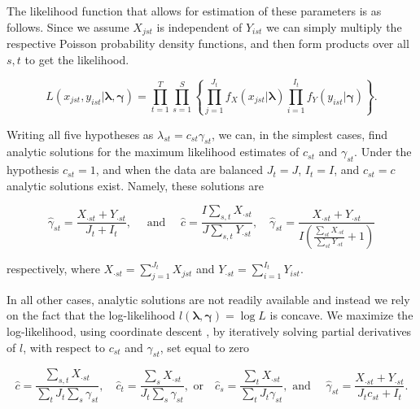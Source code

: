 The likelihood function that allows for estimation of these parameters is as follows.  Since we assume $X_{jst}$ is independent of $Y_{ist}$ we can simply multiply the respective Poisson probability density functions, and then form products over all $s,t$ to get the likelihood.  

\begin{equation}
  \label{eq:likelihood}
  L(x_{jst}, y_{ist} |\boldsymbol{\lambda}, \boldsymbol{\gamma}) = \prod_{t = 1}^{T} \prod_{s=1}^S \left\{ \prod_{j=1}^{J_t} f_X(x_{jst}|\boldsymbol{\lambda}) \prod_{i=1}^{I_t} f_Y(y_{ist} | \boldsymbol{\gamma}) \right\}.
\end{equation}

\noindent Writing all five hypotheses as $\lambda_{st} = c_{st}\gamma_{st}$, we can, in the simplest cases, find analytic solutions for the maximum likelihood estimates of $c_{st}$ and $\gamma_{st}$.  Under the hypothesis $c_{st} = 1$, and when the data are balanced $J_t = J$, $I_t = I$, and $c_{st} = c$ analytic solutions exist.  Namely, these solutions are

\begin{equation*}
  \hat{\gamma}_{st} = \frac{X_{\cdot st} + Y_{\cdot st}}{J_t + I_t}, \quad \text{ and } \quad \hat{c} = \frac{I \sum_{s,t} X_{\cdot st}}{J \sum_{s,t} Y_{\cdot st}}, \quad \hat{\gamma}_{st} = \frac{X_{\cdot st} + Y_{\cdot st}}{I \left( \frac{\sum_{st} X_{\cdot st}}{\sum_{st} Y_{\cdot st}} + 1 \right)}
\end{equation*}

\noindent respectively, where $X_{\cdot st} = \sum_{j=1}^{J_t}X_{jst}$ and $Y_{\cdot st} = \sum_{i=1}^{I_t} Y_{ist}$.

In all other cases, analytic solutions are not readily available and instead we rely on the fact that the log-likelihood $l(\boldsymbol{\lambda}, \boldsymbol{\gamma}) = \log{L}$ is concave.  We maximize the log-likelihood, using coordinate descent \citep{Luo:1992}, by iteratively solving partial derivatives of $l$, with respect to $c_{st}$ and $\gamma_{st}$, set equal to zero

\begin{equation*}
  \hat{c} = \frac{\sum_{s,t} X_{\cdot st}}{\sum_t J_t \sum_s \gamma_{st}}, \quad \hat{c}_t =  \frac{\sum_s X_{\cdot st}}{J_t \sum_s \gamma_{st}}, \text{ or} \quad \hat{c}_s = \frac{\sum_{t}X_{\cdot st}}{\sum_t J_t \gamma_{st}}, \text{ and } \quad \hat{\gamma}_{st} = \frac{X_{\cdot st} + Y_{\cdot st}}{J_t c_{st} + I_t}.
\end{equation*}

